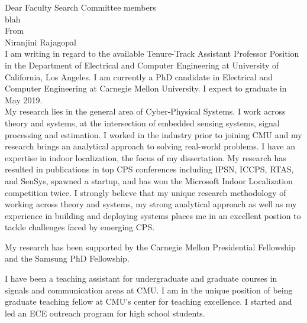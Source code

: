 \documentclass[10pt]{article}
\date{}
\begin{document}




Dear Faculty Search Committee members\\
blah\\

From\\
Niranjini Rajagopal\\


I am writing in regard to the available Tenure-Track Assistant Professor Position in the Department of Electrical and Computer Engineering at University of California, Los Angeles. I am currently a PhD candidate in Electrical and Computer Engineering at Carnegie Mellon University. I expect to graduate in May 2019. \\

My research lies in the general area of Cyber-Physical Systems. I work across theory and systems, at the intersection of embedded sensing systems, signal processing and estimation. I worked in the industry prior to joining CMU and my research brings an analytical approach to solving real-world problems. I have an expertise in indoor localization, the focus of my dissertation. My research has resulted in publications in top CPS conferences including IPSN, ICCPS, RTAS, and SenSys, spawned a startup, and has won the Microsoft Indoor Localization competition twice. I strongly believe that my unique research methodology of working across theory and systems, my strong analytical approach as well as my experience in building and deploying systems places me in an excellent postion to tackle challenges faced by emerging CPS. 

My research has been supported by the Carnegie Mellon Presidential Fellowship and the Samsung PhD Fellowship. 

I have been a teaching assistant for undergraduate and graduate courses in signals and communication areas at CMU. I am in the unique position of being  graduate teaching fellow at CMU's center for teaching excellence. I started and led an ECE outreach program for high school students. 
\end{document}
